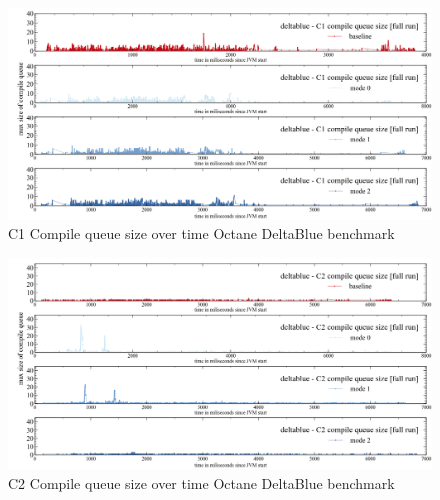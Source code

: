 \begin{figure}[ht]
  \begin{center}
    \centering
    \includegraphics[width=1.0\textwidth]{figures/octane_queue_deltablue_separate_c1.png}
    \caption{C1 Compile queue size over time Octane DeltaBlue benchmark}
    \label{f:octane_queue_deltablue_separate_c1}
  \end{center}
\end{figure}
\begin{figure}[ht]
  \begin{center}
    \centering
    \includegraphics[width=1.0\textwidth]{figures/octane_queue_deltablue_separate_c2.png}
    \caption{C2 Compile queue size over time Octane DeltaBlue benchmark}
    \label{f:octane_queue_deltablue_separate_c2}
  \end{center}
\end{figure}
